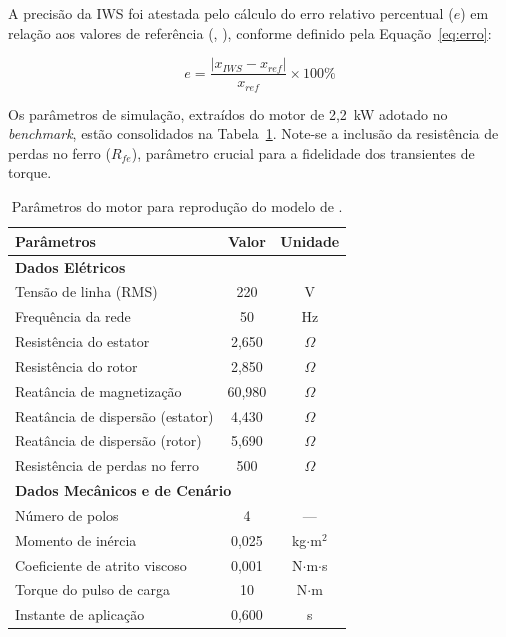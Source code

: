 \documentclass[a4paper]{ifacconf}
\begin{document}
A precisão da IWS foi atestada pelo cálculo do erro relativo percentual ($e$) em relação aos valores de referência (\citeauthor{usta2024mathematical}, \citeyear{usta2024mathematical}), conforme definido pela Equação~\ref{eq:erro}:

\begin{equation}
e = \frac{|x_{IWS} - x_{ref}|}{x_{ref}} \times 100\%
\label{eq:erro}
\end{equation}

Os parâmetros de simulação, extraídos do motor de 2,2~kW adotado no \textit{benchmark}, estão consolidados na Tabela~\ref{tab:params_usta}. Note-se a inclusão da resistência de perdas no ferro ($R_{fe}$), parâmetro crucial para a fidelidade dos transientes de torque.

\begin{table}[htbp]
\centering
\caption{Parâmetros do motor para reprodução do modelo de \cite{usta2024mathematical}.}
\label{tab:params_usta}
\begin{tabular}{lcc}
\hline
\textbf{Parâmetros} & \textbf{Valor} & \textbf{Unidade} \\ \hline
\multicolumn{3}{l}{\textbf{Dados Elétricos}} \\
Tensão de linha (RMS)        & 220     & V          \\
Frequência da rede           & 50      & Hz         \\
Resistência do estator       & 2,650   & $\Omega$   \\
Resistência do rotor         & 2,850   & $\Omega$   \\
Reatância de magnetização    & 60,980  & $\Omega$   \\
Reatância de dispersão (estator) & 4,430   & $\Omega$   \\
Reatância de dispersão (rotor)   & 5,690   & $\Omega$   \\
Resistência de perdas no ferro   & 500     & $\Omega$   \\ \hline
\multicolumn{3}{l}{\textbf{Dados Mecânicos e de Cenário}} \\
Número de polos              & 4       & ---        \\
Momento de inércia           & 0,025   & kg$\cdot$m$^2$ \\
Coeficiente de atrito viscoso & 0,001   & N$\cdot$m$\cdot$s \\
Torque do pulso de carga     & 10      & N$\cdot$m  \\
Instante de aplicação        & 0,600   & s          \\ \hline
\end{tabular}
\end{table}
\end{document}
